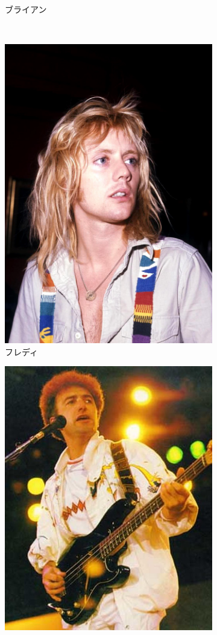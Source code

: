 \documentclass[a4j, twocolumn]{jarticle}
\begin{document}
\begin{figure}[htb]
\begin{subfigure}[b]{0.15\textwidth}
      \vspace{-1.0mm}
      \caption{ブライアン}
      \label{brianimg}
  \end{subfigure}
  \\
  \begin{subfigure}[b]{0.15\textwidth}
    \centering
    \includegraphics[height=\textwidth]{Roger.jpg}
    \vspace{-1.0mm}
    \caption{フレディ}
    \label{rogerimg}
  \end{subfigure}
  \begin{subfigure}[b]{0.15\textwidth}
    \centering
    \includegraphics[height=\textwidth]{John.jpg}

\end{subfigure}
\end{figure}
\end{document}
